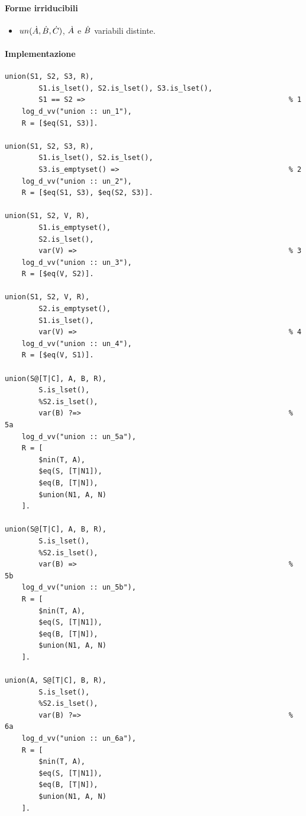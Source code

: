 \documentclass[12pt,a4paper,openright]{book} %
\begin{document}
\paragraph{Forme irriducibili}
\begin{itemize}
	\item $un(\dot{A}, \dot{B}, \dot{C})$, $\dot{A}$ e $\dot{B}$ variabili distinte.
\end{itemize}

\paragraph{Implementazione}
\begin{verbatim}
union(S1, S2, S3, R), 
        S1.is_lset(), S2.is_lset(), S3.is_lset(),
        S1 == S2 =>                                                % 1
    log_d_vv("union :: un_1"),
    R = [$eq(S1, S3)].

union(S1, S2, S3, R),
        S1.is_lset(), S2.is_lset(),
        S3.is_emptyset() =>                                        % 2
    log_d_vv("union :: un_2"),
    R = [$eq(S1, S3), $eq(S2, S3)].

union(S1, S2, V, R),
        S1.is_emptyset(),
        S2.is_lset(), 
        var(V) =>                                                  % 3
    log_d_vv("union :: un_3"),
    R = [$eq(V, S2)].

union(S1, S2, V, R),
        S2.is_emptyset(),
        S1.is_lset(), 
        var(V) =>                                                  % 4
    log_d_vv("union :: un_4"),
    R = [$eq(V, S1)].

union(S@[T|C], A, B, R),
        S.is_lset(),
        %S2.is_lset(), 
        var(B) ?=>                                                 % 5a
    log_d_vv("union :: un_5a"),
    R = [ 
        $nin(T, A), 
        $eq(S, [T|N1]), 
        $eq(B, [T|N]),
        $union(N1, A, N)
    ].

union(S@[T|C], A, B, R),
        S.is_lset(),
        %S2.is_lset(), 
        var(B) =>                                                  % 5b
    log_d_vv("union :: un_5b"),
    R = [ 
        $nin(T, A), 
        $eq(S, [T|N1]), 
        $eq(B, [T|N]),
        $union(N1, A, N)  
    ].

union(A, S@[T|C], B, R),
        S.is_lset(),
        %S2.is_lset(), 
        var(B) ?=>                                                 % 6a
    log_d_vv("union :: un_6a"),
    R = [ 
        $nin(T, A), 
        $eq(S, [T|N1]), 
        $eq(B, [T|N]),
        $union(N1, A, N)  
    ].


\end{verbatim}
\end{document}
